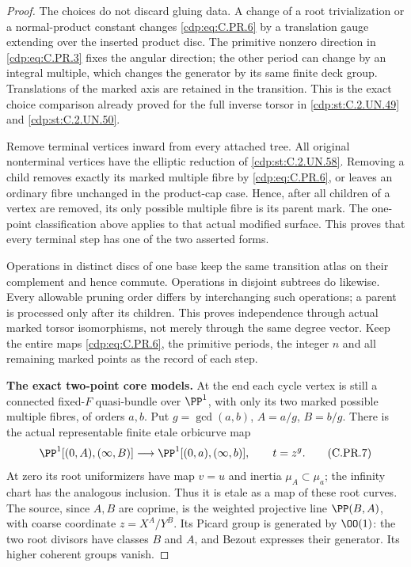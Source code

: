 \begin{proof}
The choices do not discard gluing data. A change of a root
trivialization or a normal-product constant changes \eqref{cdp:eq:C.PR.6} by
a translation gauge extending over the inserted product disc.
The primitive nonzero direction in \eqref{cdp:eq:C.PR.3} fixes the angular
direction; the other period can change by an integral multiple,
which changes the generator by its same finite deck group.
Translations of the marked axis are retained in the transition.
This is the exact choice comparison already proved for the
full inverse torsor in \ref{cdp:st:C.2.UN.49} and \ref{cdp:st:C.2.UN.50}.

Remove terminal vertices inward from every attached tree.
All original nonterminal vertices have the elliptic reduction
of \ref{cdp:st:C.2.UN.58}. Removing a child removes exactly its marked
multiple fibre by \eqref{cdp:eq:C.PR.6}, or leaves an ordinary fibre unchanged
in the product-cap case. Hence, after all children of a vertex
are removed, its only possible multiple fibre is its parent
mark. The one-point classification above applies to that
actual modified surface. This proves that every terminal step
has one of the two asserted forms.

Operations in distinct discs of one base keep the same transition
atlas on their complement and hence commute. Operations in disjoint
subtrees do likewise. Every allowable pruning order differs by
interchanging such operations; a parent is processed only after
its children. This proves independence through actual marked
torsor isomorphisms, not merely through the same degree vector.
Keep the entire maps \eqref{cdp:eq:C.PR.6}, the primitive periods, the integer
$n$ and all remaining marked points as the record of each step.

\par\medskip\noindent\textbf{The exact two-point core models.}
At the end each cycle vertex is still a connected fixed-$F$
quasi-bundle over $\PP^1$, with only its two marked possible
multiple fibres, of orders $a,b$. Put $g=\gcd(a,b)$,
$A=a/g$, $B=b/g$. There is the actual representable finite
etale orbicurve map
\[
 \PP^1[(0,A),(\infty,B)]
       \longrightarrow \PP^1[(0,a),(\infty,b)],
                         \qquad t=z^g .                \tag{C.PR.7}\label{cdp:eq:C.PR.7}
\]
At zero its root uniformizers have map $v=u$ and inertia
$\mu_A\subset\mu_a$; the infinity chart has the analogous
inclusion. Thus it is etale as a map of these root curves.
The source, since $A,B$ are coprime, is the weighted projective
line $\PP(B,A)$, with coarse coordinate
$z=X^A/Y^B$. Its Picard group is generated by $\OO(1)$:
the two root divisors have classes $B$ and $A$, and Bezout
expresses their generator. Its higher coherent groups vanish.


\end{proof}
